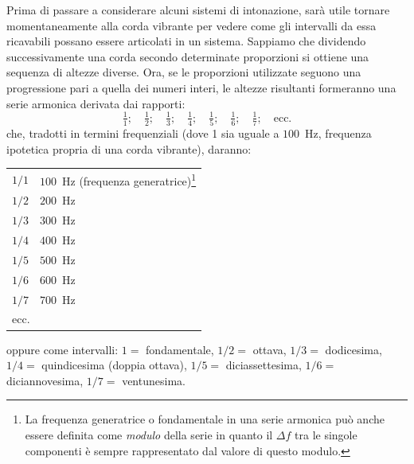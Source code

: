 Prima di passare a considerare alcuni sistemi di intonazione, sarà utile
tornare momentaneamente alla corda vibrante per vedere come gli intervalli da
essa ricavabili possano essere articolati in un sistema. Sappiamo che dividendo
successivamente una corda secondo determinate proporzioni si ottiene una
sequenza di altezze diverse. Ora, se le proporzioni utilizzate seguono una
progressione pari a quella dei numeri interi, le altezze risultanti formeranno
una serie armonica derivata dai rapporti:
\[
  \tfrac{1}{1}; \quad \tfrac{1}{2}; \quad \tfrac{1}{3}; \quad \tfrac{1}{4}; \quad
  \tfrac{1}{5}; \quad \tfrac{1}{6}; \quad \tfrac{1}{7}; \quad \text{ecc.}
\]
che, tradotti in termini frequenziali (dove 1 sia uguale a $100$~Hz, frequenza
ipotetica propria di una corda vibrante), daranno:
\begin{center}
\begin{tabular}{r@{${}={}$}l}
  $1/1$ & $100$~Hz \quad(frequenza generatrice)\footnote{La frequenza
    generatrice o fondamentale in una serie armonica può anche essere definita
    come \emph{modulo} della serie in quanto il $\Delta f$ tra le singole
    componenti è sempre rappresentato dal valore di questo modulo.} \\[4pt]
  $1/2$ & $200$~Hz \\[4pt]
  $1/3$ & $300$~Hz \\[4pt]
  $1/4$ & $400$~Hz \\[4pt]
  $1/5$ & $500$~Hz \\[4pt]
  $1/6$ & $600$~Hz \\[4pt]
  $1/7$ & $700$~Hz \\
  \multicolumn{2}{l}{ecc.} \\
\end{tabular}
\end{center}
oppure come intervalli: $1 = $ fondamentale, $1/2 = $ ottava,
$1/3 = $ dodicesima, $1/4 = $ quindicesima (doppia ottava),
$1/5 = $ diciassettesima, $1/6 = $ diciannovesima,
$1/7 = $ ventunesima.

